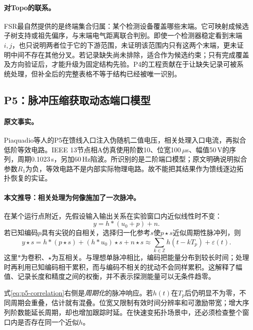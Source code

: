 \paragraph{对Topo的联系。}
FSR最自然提供的是终端集合归属：某个检测设备覆盖哪些末端。它可映射成候选子树支持或祖先偏序，与末端电气距离联合判别。即使一个检测器稳定看到末端$i,j$，也只说明两者位于它的下游范围，未证明该范围内只有这两个末端，更未证明中间不存在其他分叉。若记录缺失尚未排除，适合作为候选约束；只有完成覆盖及方向验证后，才能升级为固定结构先验。P4的工程贡献在于让缺失记录可被系统处理，但补全后的完整表格不等于结构已经被唯一识别。

\subsection{P5：脉冲压缩获取动态端口模型}
\label{subsec:P5}

\paragraph{原文事实。}
Piaquadio等人的P5\citep{P5}在馈线入口注入伪随机二值电压，相关处理入口电流，再拟合低阶等效电路。IEEE 13节点相A仿真使用阶数10、位宽100\,$\mu$s、幅值50\,V的序列，周期0.1023\,s，另加60\,Hz陷波。所识别的是二阶端口模型；原文明确说明拟合参数$R_1$为负，等效电路不是内部实际物理电路。故不能把其结果作为馈线逐边拓扑恢复的实证。

\paragraph{本文推导：相关处理为何像施加了一次脉冲。}
在某个运行点附近，先假设输入输出关系在实验窗口内近似线性时不变：
\begin{equation}
 y=h*(u_0+p)+n.
 \label{eq:p5-lti}
\end{equation}
若已知编码$p$具有尖锐的自相关，选择归一化参考$s$使$p\star s$近似周期性脉冲列，则
\begin{equation}
 y\star s=h*(p\star s)+(h*u_0)\star s+n\star s
 \approx\sum_{k\in\mathbb Z}h(t-kT_p)+\varepsilon(t).
 \label{eq:p5-correlation}
\end{equation}
这里$*$为卷积、$\star$为互相关。与理想单脉冲相比，编码把能量分布到较长时间；处理时再利用已知编码相干累积，而与编码不相关的扰动不会同样累积。这解释了幅值、记录长度和精度之间的权衡，并不表示探测能量可以无条件趋零。

式\eqref{eq:p5-correlation}右侧是\emph{周期化}的脉冲响应。若$h(t)$在$T_p$后仍明显不为零，不同周期会重叠，估计就有混叠。位宽又限制有效时间分辨率和可激励带宽；增大序列阶数能延长周期，却也增加跟踪时延。在快速变拓扑场景中，还必须检查整个窗口内是否存在同一个近似$h$。

